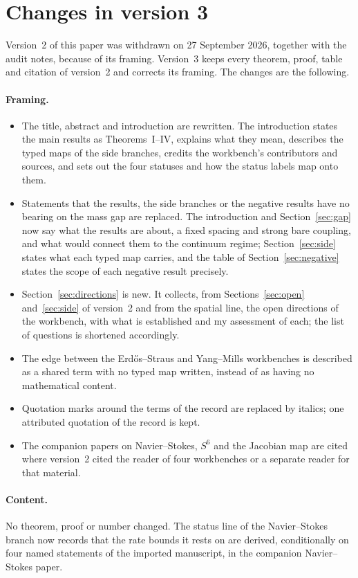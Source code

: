 \section{Changes in version 3}\label{app:changes}

Version~2 of this paper was withdrawn on 27 September 2026, together with the audit notes, because of its framing. Version~3 keeps every theorem, proof, table and citation of version~2 and corrects its framing. The changes are the following.

\paragraph{Framing.}
\begin{itemize}
\item The title, abstract and introduction are rewritten. The introduction states the main results as Theorems~I--IV, explains what they mean, describes the typed maps of the side branches, credits the workbench's contributors and sources, and sets out the four statuses and how the status labels map onto them.
\item Statements that the results, the side branches or the negative results have no bearing on the mass gap are replaced. The introduction and Section~\ref{sec:gap} now say what the results are about, a fixed spacing and strong bare coupling, and what would connect them to the continuum regime; Section~\ref{sec:side} states what each typed map carries, and the table of Section~\ref{sec:negative} states the scope of each negative result precisely.
\item Section~\ref{sec:directions} is new. It collects, from Sections~\ref{sec:open} and~\ref{sec:side} of version~2 and from the spatial line, the open directions of the workbench, with what is established and my assessment of each; the list of questions is shortened accordingly.
\item The edge between the Erdős--Straus and Yang--Mills workbenches is described as a shared term with no typed map written, instead of as having no mathematical content.
\item Quotation marks around the terms of the record are replaced by italics; one attributed quotation of the record is kept.
\item The companion papers on Navier--Stokes, $S^6$ and the Jacobian map are cited where version~2 cited the reader of four workbenches or a separate reader for that material.
\end{itemize}

\paragraph{Content.}
No theorem, proof or number changed. The status line of the Navier--Stokes branch now records that the rate bounds it rests on are derived, conditionally on four named statements of the imported manuscript, in the companion Navier--Stokes paper.
